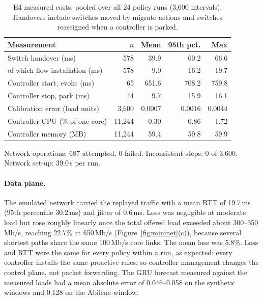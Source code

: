 \begin{table}[htbp]
\centering
\caption{E4 measured costs, pooled over all 24 policy runs (3,600 intervals). Handovers include switches moved by migrate actions and switches reassigned when a controller is parked.}
\label{tab:mn-costs}
\small
\begin{tabular}{@{}lrrrr@{}}
\toprule
\textbf{Measurement} & \textbf{$n$} & \textbf{Mean} & \textbf{95th pct.} & \textbf{Max}\\
\midrule
Switch handover (ms) & 578 & 39.9 & 60.2 & 66.6\\
\quad of which flow installation (ms) & 578 & 9.0 & 16.2 & 19.7\\
Controller start, evoke (ms) & 65 & 651.6 & 708.2 & 759.8\\
Controller stop, park (ms) & 44 & 9.7 & 15.9 & 16.1\\
Calibration error (load units) & 3,600 & 0.0007 & 0.0016 & 0.0044\\
Controller CPU (\% of one core) & 11,244 & 0.30 & 0.86 & 1.72\\
Controller memory (MB) & 11,244 & 59.4 & 59.8 & 59.9\\
\bottomrule
\end{tabular}
\par\smallskip\footnotesize Network operations: 687 attempted, 0 failed. Inconsistent steps: 0 of 3,600. Network set-up: 39.0\,s per run.
\end{table}

\paragraph{Data plane.} The emulated network carried the replayed traffic with a mean RTT of 19.7\,ms (95th percentile 30.2\,ms) and jitter of 0.6\,ms. Loss was negligible at moderate load but rose roughly linearly once the total offered load exceeded about 300--350\,Mb/s, reaching 22.7\% at 650\,Mb/s (Figure~\ref{fig:mininet}(c)), because several shortest paths share the same 100\,Mb/s core links. The mean loss was 5.8\%. Loss and RTT were the same for every policy within a run, as expected: every controller installs the same proactive rules, so controller management changes the control plane, not packet forwarding. The GRU forecast measured against the measured loads had a mean absolute error of 0.046--0.058 on the synthetic windows and 0.128 on the Abilene window.


